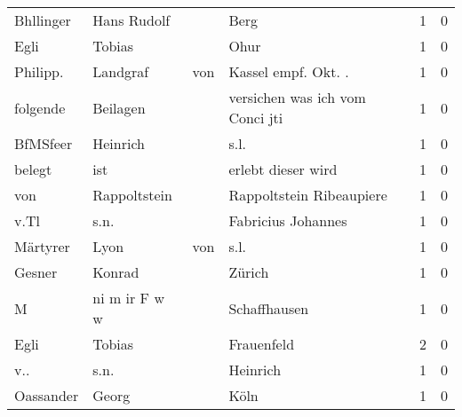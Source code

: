 \documentclass[10pt,a4paper,landscape]{article}
\begin{document}
\begin{longtable}{llllrr}
                Bhllinger &                        Hans Rudolf &             &                                        Berg &          1 &         0 \\
                     Egli &                             Tobias &             &                                        Ohur &          1 &         0 \\
                 Philipp. &                           Landgraf &         von &                        Kassel empf. Okt. .  &          1 &         0 \\
                 folgende &                           Beilagen &             &             versichen was ich vom Conci jti &          1 &         0 \\
                 BfMSfeer &                           Heinrich &             &                                        s.l. &          1 &         0 \\
                   belegt &                                ist &             &                          erlebt dieser wird &          1 &         0 \\
                      von &                       Rappoltstein &             &                    Rappoltstein Ribeaupiere &          1 &         0 \\
                     v.Tl &                               s.n. &             &                          Fabricius Johannes &          1 &         0 \\
                 Märtyrer &                               Lyon &         von &                                        s.l. &          1 &         0 \\
                   Gesner &                             Konrad &             &                                      Zürich &          1 &         0 \\
                        M &                      ni m ir F w w &             &                                Schaffhausen &          1 &         0 \\
                     Egli &                             Tobias &             &                                  Frauenfeld &          2 &         0 \\
                      v.. &                               s.n. &             &                                    Heinrich &          1 &         0 \\
                Oassander &                              Georg &             &                                        Köln &          1 &         0 \\

\end{longtable}
\end{document}
